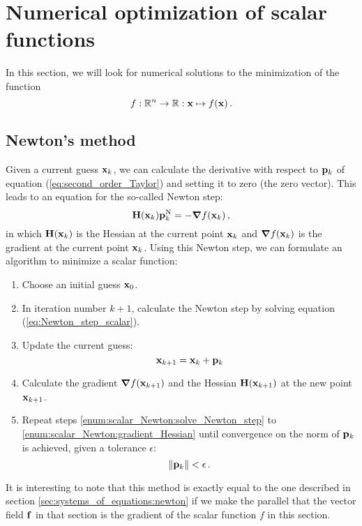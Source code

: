 \section{Numerical optimization of scalar functions}
    In this section, we will look for numerical solutions to the minimization of the function
    \begin{equation}
        f : \mathbb{R}^n \to \mathbb{R} : \vb{x} \mapsto f(\vb{x}) \thinspace .
    \end{equation}

    \subsection{Newton's method}
        Given a current guess $\vb{x}_k$, we can calculate the derivative with respect to $\vb{p}_k$ of equation (\ref{eq:second_order_Taylor}) and setting it to zero (the zero vector). This leads to an equation for the so-called Newton step:
        \begin{equation} \label{eq:Newton_step_scalar}
            \vb{H}(\vb{x}_k) \vb{p}^\text{N}_k = - \grad{f(\vb{x}_k)} \thinspace ,
        \end{equation}
        in which $\vb{H}(\vb{x}_k)$ is the Hessian at the current point $\vb{x}_k$ and $\grad{f(\vb{x}_k)}$ is the gradient at the current point $\vb{x}_k$. Using this Newton step, we can formulate an algorithm to minimize a scalar function:
        \begin{enumerate}
            \item Choose an initial guess $\vb{x}_0$.

            \item \label{enum:scalar_Newton:solve_Newton_step} In iteration number $k+1$, calculate the Newton step by solving equation (\ref{eq:Newton_step_scalar}).

            \item Update the current guess:
                \begin{equation}
                    \vb{x}_{k+1} = \vb{x}_k + \vb{p}_k
                \end{equation}

            \item \label{enum:scalar_Newton:gradient_Hessian} Calculate the gradient $\grad{f(\vb{x}_{k+1})}$ and the Hessian $\vb{H}(\vb{x}_{k+1})$ at the new point $\vb{x}_{k+1}$.

            \item Repeat steps \ref{enum:scalar_Newton:solve_Newton_step} to \ref{enum:scalar_Newton:gradient_Hessian} until convergence on the norm of $\vb{p}_k$ is achieved, given a tolerance $\epsilon$:
                \begin{equation}
                    \norm{\vb{p}_k} < \epsilon \thinspace .
                \end{equation}
        \end{enumerate}

        It is interesting to note that this method is exactly equal to the one described in section \ref{sec:systems_of_equations:newton} if we make the parallel that the vector field $\vb{f}$ in that section is the gradient of the scalar function $f$ in this section.

